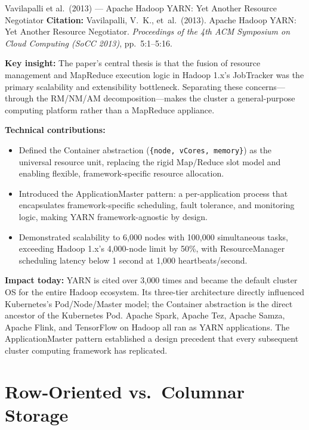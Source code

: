 \begin{researchspotlight}{Vavilapalli et al.\ (2013) --- Apache Hadoop YARN: Yet Another Resource Negotiator}
\textbf{Citation:} Vavilapalli, V.~K., et~al.\ (2013). Apache Hadoop
YARN: Yet Another Resource Negotiator. \textit{Proceedings of the
4th ACM Symposium on Cloud Computing (SoCC 2013)},
pp.\ 5:1--5:16. \parencite{YARN2013}

\smallskip\noindent
\textbf{Key insight:} The paper's central thesis is that the fusion of
resource management and MapReduce execution logic in Hadoop 1.x's
JobTracker was the primary scalability and extensibility bottleneck.
Separating these concerns---through the RM/NM/AM decomposition---makes
the cluster a general-purpose computing platform rather than a
MapReduce appliance.

\smallskip\noindent
\textbf{Technical contributions:}
\begin{itemize}
  \item Defined the Container abstraction (\texttt{\{node, vCores, memory\}})
        as the universal resource unit, replacing the rigid Map/Reduce
        slot model and enabling flexible, framework-specific resource
        allocation.
  \item Introduced the ApplicationMaster pattern: a per-application
        process that encapsulates framework-specific scheduling, fault
        tolerance, and monitoring logic, making YARN framework-agnostic
        by design.
  \item Demonstrated scalability to 6{,}000 nodes with 100{,}000
        simultaneous tasks, exceeding Hadoop 1.x's 4{,}000-node limit
        by 50\%, with ResourceManager scheduling latency below
        1 second at 1{,}000 heartbeats/second.
\end{itemize}

\smallskip\noindent
\textbf{Impact today:} YARN is cited over 3{,}000 times and became
the default cluster OS for the entire Hadoop ecosystem. Its three-tier
architecture directly influenced Kubernetes's Pod/Node/Master model;
the Container abstraction is the direct ancestor of the Kubernetes Pod.
Apache Spark, Apache Tez, Apache Samza, Apache Flink, and TensorFlow
on Hadoop all ran as YARN applications. The ApplicationMaster pattern
established a design precedent that every subsequent cluster computing
framework has replicated.
\end{researchspotlight}

\section{Row-Oriented vs.\ Columnar Storage}
\label{sec:row-columnar}


